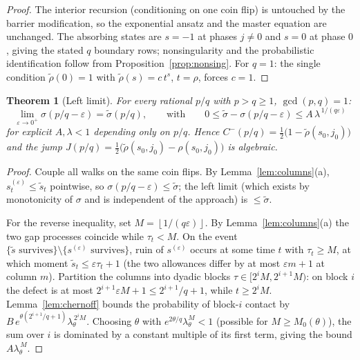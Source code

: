 \documentclass[11pt]{article}
\newtheorem{theorem}{Theorem}
\theoremstyle{definition}
\theoremstyle{remark}
\newcommand{\floor}[1]{\left\lfloor #1 \right\rfloor}
\begin{document}
\begin{proof}
The interior recursion (conditioning on one coin flip) is untouched by
the barrier modification, so the exponential ansatz and the master
equation are unchanged.
The absorbing states are $s = -1$ at phases $j \neq 0$ and $s = 0$ at
phase $0$, giving the stated $q$ boundary rows; nonsingularity and the
probabilistic identification follow from
Proposition~\ref{prop:nonsing}.
For $q = 1$: the single condition $\tilde\rho(0) = 1$ with
$\tilde\rho(s) = c\,t^s$, $t = \rho$, forces $c = 1$.
\end{proof}

\begin{theorem}[Left limit]\label{thm:left}
For every rational $p/q$ with $p > q \geq 1$, $\gcd(p,q) = 1$:
\[
\lim_{\varepsilon \to 0^+} \sigma(p/q - \varepsilon)
= \tilde\sigma(p/q),
\qquad\text{with}\qquad
0 \leq \tilde\sigma - \sigma(p/q - \varepsilon)
\leq A\,\lambda^{\,1/(q\varepsilon)}
\]
for explicit $A, \lambda < 1$ depending only on $p/q$.
Hence $C^-(p/q) = \tfrac12\bigl(1 - \tilde\rho(s_0, j_0)\bigr)$ and
the jump
$J(p/q) = \tfrac12\bigl(\tilde\rho(s_0,j_0) - \rho(s_0,j_0)\bigr)$ is
algebraic.
\end{theorem}

\begin{proof}
Couple all walks on the same coin flips.
By Lemma~\ref{lem:columns}(a), $s^{(\varepsilon)}_t \leq \tilde s_t$
pointwise, so $\sigma(p/q - \varepsilon) \leq \tilde\sigma$; the left
limit (which exists by monotonicity of $\sigma$ and is independent of
the approach) is $\leq \tilde\sigma$.

For the reverse inequality, set $M = \floor{1/(q\varepsilon)}$.
By Lemma~\ref{lem:columns}(a) the two gap processes coincide while
$\tau_t < M$.
On the event $\{\tilde s \text{ survives}\} \setminus
\{s^{(\varepsilon)} \text{ survives}\}$, ruin of $s^{(\varepsilon)}$
occurs at some time $t$ with $\tau_t \geq M$, at which moment
$\tilde s_t \leq \varepsilon \tau_t + 1$
(the two allowances differ by at most $\varepsilon m + 1$ at column
$m$).
Partition the columns into dyadic blocks $\tau \in [2^i M, 2^{i+1} M)$:
on block $i$ the defect is at most $2^{i+1}\varepsilon M + 1 \leq
2^{i+1}/q + 1$, while $t \geq 2^i M$.
Lemma~\ref{lem:chernoff} bounds the probability of block-$i$ contact by
$B\,e^{\theta(2^{i+1}/q + 1)}\lambda_\theta^{\,2^i M}$.
Choosing $\theta$ with $e^{2\theta/q} \lambda_\theta^{M} < 1$ (possible
for $M \geq M_0(\theta)$), the sum over $i$ is dominated by a constant
multiple of its first term, giving the bound
$A \lambda_\theta^{\,M}$.
\end{proof}
\end{document}

